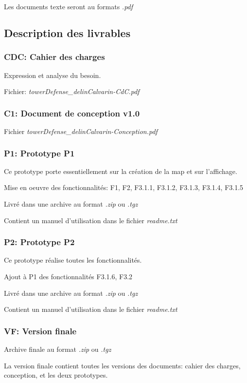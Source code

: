 \documentclass{scrartcl}
\begin{document}
\begin{flushleft}
  Les documents texte seront au formats \emph{.pdf}
	  \subsection{Description des livrables}
		    \subsubsection{CDC: Cahier des charges}
		      Expression et analyse du besoin.
		      
		      Fichier: \emph{towerDefense\_delinCalvarin-CdC.pdf}
		    \subsubsection{C1: Document de conception v1.0}
		      Fichier \emph{towerDefense\_delinCalvarin-Conception.pdf}
		    \subsubsection{P1: Prototype P1}
		      Ce prototype porte essentiellement sur la création de la map et sur l'affichage.
		      
		      Mise en oeuvre des fonctionnalités: F1, F2, F3.1.1, F3.1.2, F3.1.3, F3.1.4, F3.1.5
		      
		      Livré dans une archive au format \emph{.zip} ou \emph{.tgz}
		      
		      Contient un manuel d'utilisation dans le fichier \emph{readme.txt}
		     \subsubsection{P2: Prototype P2}
		      Ce prototype réalise toutes les fonctionnalités.
		      
		      Ajout à P1 des fonctionnalités F3.1.6, F3.2
		      
		      Livré dans une archive au format \emph{.zip} ou \emph{.tgz}
		      
		      Contient un manuel d'utilisation dans le fichier \emph{readme.txt}
		     \subsubsection{VF: Version finale}
		      Archive finale au format \emph{.zip} ou \emph{.tgz}
		      
		      La version finale contient toutes les versions des documents: cahier des charges, conception, et les deux prototypes.
  
\end{flushleft}
\end{document}

